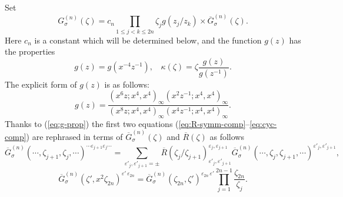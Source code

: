 \documentclass[a4paper,10pt]{article}
\begin{document}
Set 
\begin{equation}
 G_{\sigma}^{(n)}(\zeta)
=c_n \prod_{1\leqslant j< k \leqslant 2n} \zeta_j g(z_j/z_k)
\times \overline{G}_{\sigma}^{(n)}(\zeta). 
\label{eq:G-bar}
\end{equation}
Here $c_n$ is a constant which will be determined below, 
and the function $g(z)$ has the properties 
\begin{equation}
g(z)=g(x^{-4}z^{-1}), ~~~~ 
\kappa (\zeta )=\zeta \frac{g(z)}{g(z^{-1})}. 
\label{eq:g-prop}
\end{equation}
The explicit form of $g(z)$ is as follows: 
\begin{equation}
g(z)=\frac{(x^6 z;x^4,x^4)_{\infty}
(x^2 z^{-1};x^4,x^4)_{\infty}}
{(x^8 z;x^4,x^4)_{\infty}(x^4 z^{-1};x^4,x^4)_{\infty}}. 
\label{eq:df-g}
\end{equation}
Thanks to (\ref{eq:g-prop}) the first two equations 
(\ref{eq:R-symm-comp}--\ref{eq:cyc-comp}) are 
rephrased in terms of 
$\overline{G}_{\sigma}^{(n)}(\zeta)$ 
and $\overline{R}(\zeta)$ as follows 
\begin{equation}
\overline{G}_{\sigma}^{(n)} 
(\cdots,\zeta_{j+1},\zeta_j,\cdots)^{\cdots 
\varepsilon_{j+1}\varepsilon_j\cdots}
=\sum_{\varepsilon'_j , \varepsilon'_{j+1}=\pm} 
\overline{R}(\zeta_j/\zeta_{j+1})^{
\varepsilon_j , \varepsilon_{j+1}}_{
\varepsilon'_j , \varepsilon'_{j+1}}
\overline{G}_{\sigma}^{(n)} 
(\cdots,\zeta_j,\zeta_{j+1},\cdots)^{
\varepsilon'_j , \varepsilon'_{j+1}}, 
\label{eq:R-symm'} 
\end{equation}
\begin{equation}
\overline{G}_{\sigma}^{(n)} 
(\zeta', x^{2}\zeta_{2n})^{
\varepsilon'\,\varepsilon_{2n}}
=\overline{G}_{\sigma}^{(n)} 
(\zeta_{2n},\zeta')^{
\varepsilon_{2n}\,\varepsilon'}
\prod_{j=1}^{2n-1} \frac{\zeta_{2n}}{\zeta_j}.
\label{eq:cyc'}
\end{equation}
\end{document}
